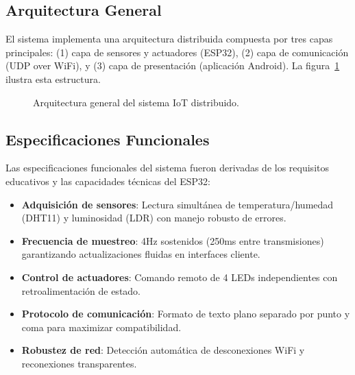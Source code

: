 \documentclass[conference,a4paper]{IEEEtran}
\begin{document}
\subsection{Arquitectura General}

El sistema implementa una arquitectura distribuida compuesta por tres capas principales: (1) capa de sensores y actuadores (ESP32), (2) capa de comunicaci\'on (UDP over WiFi), y (3) capa de presentaci\'on (aplicaci\'on Android). La figura~\ref{fig:architecture} ilustra esta estructura.

\begin{figure}[H]
    \centering
    \caption{Arquitectura general del sistema IoT distribuido.}
    \label{fig:architecture}
\end{figure}

\subsection{Especificaciones Funcionales}

Las especificaciones funcionales del sistema fueron derivadas de los requisitos educativos y las capacidades t\'ecnicas del ESP32:

\begin{itemize}
    \item \textbf{Adquisici\'on de sensores}: Lectura simult\'anea de temperatura/humedad (DHT11) y luminosidad (LDR) con manejo robusto de errores.
    \item \textbf{Frecuencia de muestreo}: 4Hz sostenidos (250ms entre transmisiones) garantizando actualizaciones fluidas en interfaces cliente.
    \item \textbf{Control de actuadores}: Comando remoto de 4 LEDs independientes con retroalimentaci\'on de estado.
    \item \textbf{Protocolo de comunicaci\'on}: Formato de texto plano separado por punto y coma para maximizar compatibilidad.
    \item \textbf{Robustez de red}: Detecci\'on autom\'atica de desconexiones WiFi y reconexiones transparentes.
\end{itemize}
\end{document}
